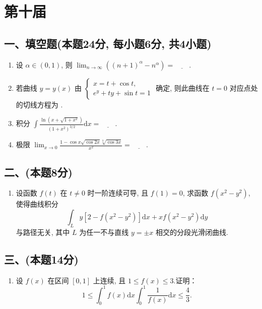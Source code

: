 \newpage
\section{第十届}

\subsection*{一、填空题(本题24分,  每小题6分,  共4小题)}
\begin{enumerate}
    \item 设 $\alpha \in (0, 1)$,  则 $\displaystyle\lim_{n \to \infty} \left( (n+1)^\alpha - n^\alpha \right) = \underline{\quad\quad}$.
    \item 若曲线 $y = y(x)$ 由 $
              \begin{cases}
                  x = t + \cos t, \\
                  e^y + ty + \sin t = 1
              \end{cases}
          $ 确定,  则此曲线在 $t = 0$ 对应点处的切线方程为 \underline{\quad\quad}.
    \item 积分 $\displaystyle\int \frac{\ln \left( x + \sqrt{1 + x^2} \right)}{(1 + x^2)^{3/2}}  \mathrm{d}x = \underline{\quad\quad}$.
    \item 极限 $\displaystyle\lim_{x \to 0} \frac{1 - \cos x \sqrt{\cos 2x} \sqrt[3]{\cos 3x}}{x^2} = \underline{\quad\quad}$.
\end{enumerate}

\subsection*{二、(本题8分)}
\begin{enumerate}[start=5]
    \item 设函数 $f(t)$ 在 $t \neq 0$ 时一阶连续可导,  且 $f(1) = 0$,  求函数 $f(x^2 - y^2)$,  使得曲线积分
          \[
              \int_L y \left[ 2 - f(x^2 - y^2) \right]  \mathrm{d}x + x f(x^2 - y^2)  \mathrm{d}y
          \]
          与路径无关,  其中 $L$ 为任一不与直线 $y = \pm x$ 相交的分段光滑闭曲线.
\end{enumerate}

\subsection*{三、(本题14分)}
\begin{enumerate}[start=6]
    \item 设 $f(x)$ 在区间 $[0, 1]$ 上连续,  且 $1 \leqslant f(x) \leqslant 3$.证明：
          \[
              1 \leqslant \int_0^1 f(x)  \mathrm{d}x \int_0^1 \frac{1}{f(x)}  \mathrm{d}x \leqslant \frac{4}{3}.
          \]
\end{enumerate}

